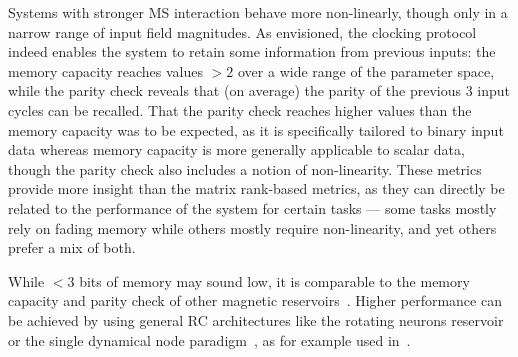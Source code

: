 Systems with stronger MS interaction behave more non-linearly, though only in a narrow range of input field magnitudes.
As envisioned, the clocking protocol indeed enables the system to retain some information from previous inputs: the memory capacity reaches values $>2$ over a wide range of the parameter space, while the parity check reveals that (on average) the parity of the previous 3 input cycles can be recalled.
That the parity check reaches higher values than the memory capacity was to be expected, as it is specifically tailored to binary input data whereas memory capacity is more generally applicable to scalar data, though the parity check also includes a notion of non-linearity.
These metrics provide more insight than the matrix rank-based metrics, as they can directly be related to the performance of the system for certain tasks --- some tasks mostly rely on fading memory while others mostly require non-linearity, and yet others prefer a mix of both. \par
While $<3$ bits of memory may sound low, it is comparable to the memory capacity and parity check of other magnetic reservoirs~\cite{AdaptiveProgrammableRC,hon2021numerical,tsunegi2019STOforcedsyncRC,Venkat_2024,Vidamour_2022}. %
Higher performance can be achieved by using general RC architectures like the rotating neurons reservoir~\cite{RotatingNeuronsRC} or the single dynamical node paradigm~\cite{appeltant2011information}, as for example used in~.

